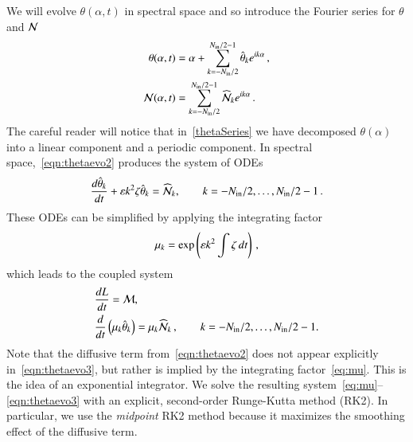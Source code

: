 \documentclass[preprint, 10pt]{elsarticle}
\begin{document}
We will evolve $\theta(\alpha,t)$ in spectral space and so introduce the Fourier series for $\theta$ and $\mathcal{N}$
\begin{align}
\label{thetaSeries}
 \theta(\alpha,t) &= \alpha + \FourierSum \thhat_k e^{ i k \alpha} \, , \\
 \NLterm(\alpha,t)  &= \FourierSum \widehat{\NLterm}_k e^{ i k \alpha} \, .
\end{align}
The careful reader will notice that in~\eqref{thetaSeries} we have decomposed $\theta(\alpha)$ into a linear component and a periodic component. In spectral space,~\eqref{eqn:thetaevo2} produces the system of ODEs
\begin{align*}
\tderiv{\thhat_k}{t} +  \eps k^2  \elfun \thhat_k = \widehat{\NLterm}_k,
\qquad k=-N_\iin/2,\ldots,N_\iin/2-1\, .
\end{align*}
These ODEs can be simplified by applying the integrating factor
\begin{align}
\label{eq:mu}
\mu_k = \exp \left( \varepsilon k^2 \int \zeta \, dt \right) \, ,
\end{align}
which leads to the coupled system
\begin{align}
\label{eqn:Levo3}
& \tderiv{L}{t} = \Mterm, \\
\label{eqn:thetaevo3}
& \tderiv{}{t}\left( \mu_k \thhat_k \right) = \mu_k \widehat{\NLterm}_k \, ,
\qquad k = -N_\iin/2, \ldots, N_\iin/2 -1.
\end{align}
Note that the diffusive term from~\eqref{eqn:thetaevo2} does not appear explicitly in~\eqref{eqn:thetaevo3}, but rather is implied by the integrating factor~\eqref{eq:mu}. This is the idea of an exponential integrator. We solve the resulting system~\eqref{eq:mu}--\eqref{eqn:thetaevo3} with an
explicit, second-order Runge-Kutta method (RK2). In particular, we use the {\em midpoint} RK2 method because it maximizes the smoothing effect of the diffusive term.
\end{document}
